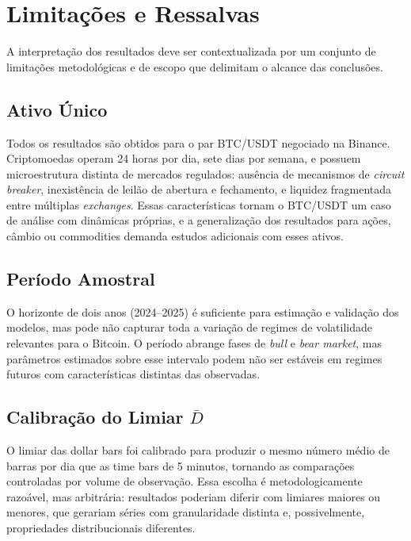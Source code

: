 \section{Limitações e Ressalvas}
\label{sec:limitacoes}

A interpretação dos resultados deve ser contextualizada por um conjunto de limitações
metodológicas e de escopo que delimitam o alcance das conclusões.

\subsection{Ativo Único}
\label{subsec:lim_ativo}

Todos os resultados são obtidos para o par BTC/USDT negociado na Binance.
Criptomoedas operam 24 horas por dia, sete dias por semana, e possuem microestrutura
distinta de mercados regulados: ausência de mecanismos de \textit{circuit breaker}, inexistência
de leilão de abertura e fechamento, e liquidez fragmentada entre múltiplas \textit{exchanges}.
Essas características tornam o BTC/USDT um caso de análise com dinâmicas próprias,
e a generalização dos resultados para ações, câmbio ou commodities demanda estudos
adicionais com esses ativos.

\subsection{Período Amostral}
\label{subsec:lim_periodo}

O horizonte de dois anos (2024--2025) é suficiente para estimação e validação dos modelos,
mas pode não capturar toda a variação de regimes de volatilidade relevantes para o Bitcoin.
O período abrange fases de \textit{bull} e \textit{bear market}, mas parâmetros estimados
sobre esse intervalo podem não ser estáveis em regimes futuros com características distintas
das observadas.

\subsection{Calibração do Limiar \texorpdfstring{$\bar{D}$}{D-barra}}
\label{subsec:lim_limiar}

O limiar das dollar bars foi calibrado para produzir o mesmo número médio de barras por dia
que as time bars de 5 minutos, tornando as comparações controladas por volume de observação.
Essa escolha é metodologicamente razoável, mas arbitrária: resultados poderiam diferir com
limiares maiores ou menores, que gerariam séries com granularidade distinta e, possivelmente,
propriedades distribucionais diferentes.

